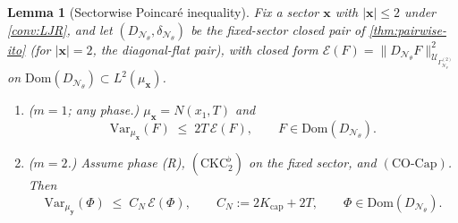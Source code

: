 \documentclass[reqno,final,11pt]{amsart}
\theoremstyle{plain}
\newtheorem{lemma}[theorem]{Lemma}
\theoremstyle{definition}
\theoremstyle{remark}
\newcommand{\Dom}{\mathrm{Dom}}
\newcommand{\cE}{\mathcal E}
\newcommand{\cN}{\mathcal N}
\newcommand{\cU}{\mathcal U}
\newcommand{\GamN}{\Gamma^{(2)}_{\cN_\theta}}
\newcommand{\DN}{D_{\cN_\theta}}
\newcommand{\divN}{\delta_{\cN_\theta}}
\newcommand{\COcap}{(\mathrm{CO\text{-}Cap})}
\begin{document}
\begin{lemma}[Sectorwise Poincar\'e inequality]\label{lem:sector-poincare}
Fix a sector $\mathbf x$ with $|\mathbf x|\le2$ under \cref{conv:LJR}, and let
$(\DN,\divN)$ be the fixed-sector closed pair of \cref{thm:pairwise-ito} (for
$|\mathbf x|=2$, the diagonal-flat pair), with closed form
$\cE(F)=\|\DN F\|^2_{\cU_{\GamN}}$ on $\Dom(\DN)\subset L^2(\mu_{\mathbf x})$.
\begin{enumerate}
\item[$(\mathrm i)$] ($m=1$; any phase.) $\mu_{\mathbf x}=N(x_1,T)$
and
\[
  \mathrm{Var}_{\mu_{\mathbf x}}(F)\;\le\;2T\,\cE(F),
  \qquad F\in\Dom(\DN).
\]
\item[$(\mathrm{ii})$] ($m=2$.) Assume phase \textnormal{(R)},
$(\mathrm{CKC}_2^{\flat})$ on the fixed sector, and $\COcap$. Then
\[
  \mathrm{Var}_{\mu_{\mathbf y}}(\Phi)\;\le\;C_N\,\cE(\Phi),
  \qquad C_N:=2K_{\mathrm{cap}}+2T,
  \qquad \Phi\in\Dom(\DN).
\]
\end{enumerate}
\end{lemma}
\end{document}
